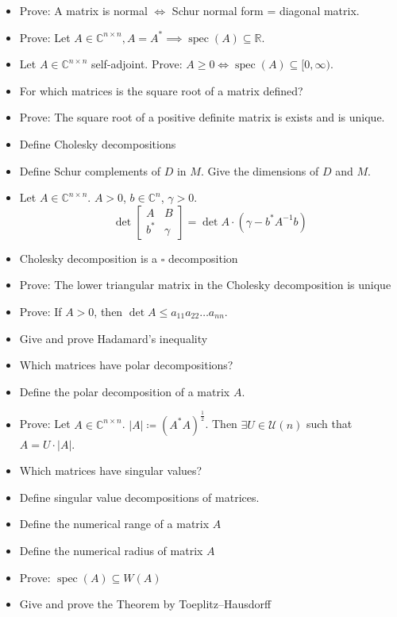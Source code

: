 \documentclass[a4paper]{article}
\newcommand{\card}[1]{\left|#1\right|}
\begin{document}
\begin{itemize}
  \item Prove: A matrix is normal $\iff$ Schur normal form = diagonal matrix.
  \item Prove: Let $A \in \mathbb C^{n \times n}, A = A^* \implies \operatorname{spec}(A) \subseteq \mathbb R$.
  \item Let $A \in \mathbb C^{n \times n}$ self-adjoint. Prove: $A \geq 0 \iff \operatorname{spec}(A) \subseteq [0, \infty)$.
  \item For which matrices is the square root of a matrix defined?
  \item Prove: The square root of a positive definite matrix is exists and is unique.
  \item Define Cholesky decompositions
  \item Define Schur complements of $D$ in $M$. Give the dimensions of $D$ and $M$.
  \item Let $A \in \mathbb C^{n \times n}$. $A > 0$, $b \in \mathbb C^n$, $\gamma > 0$.
    \[ \det\left[\begin{array}{c|c}A & B \\ \hline b^* & \gamma \end{array}\right] = \det A \cdot (\gamma - b^* A^{-1} b)  \]
  \item Cholesky decomposition is a $\square{}$ decomposition
  \item Prove: The lower triangular matrix in the Cholesky decomposition is unique
  \item Prove: If $A > 0$, then $\det{A} \leq a_{11} a_{22} \dots a_{nn}$.
  \item Give and prove Hadamard's inequality
  \item Which matrices have polar decompositions?
  \item Define the polar decomposition of a matrix $A$.
  \item Prove: Let $A \in \mathbb C^{n \times n}$. $\card{A} \coloneqq (A^* A)^{\frac12}$. Then $\exists U \in \mathcal U(n)$ such that $A = U \cdot \card{A}$.
  \item Which matrices have singular values?
  \item Define singular value decompositions of matrices.
  \item Define the numerical range of a matrix $A$
  \item Define the numerical radius of matrix $A$
  \item Prove: $\operatorname{spec}(A) \subseteq W(A)$
  \item Give and prove the Theorem by Toeplitz--Hausdorff

\end{itemize}
\end{document}

